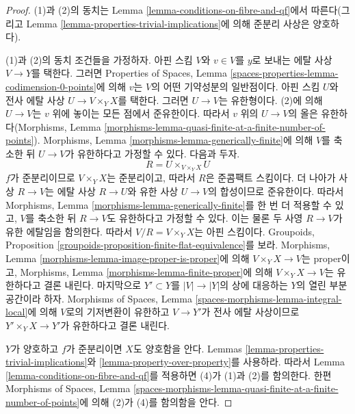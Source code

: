 \begin{proof}
(1)과 (2)의 동치는 Lemma \ref{lemma-conditions-on-fibre-and-qf}에서
따른다(그리고 Lemma \ref{lemma-properties-trivial-implications}에
의해 준분리 사상은 양호하다).

\medskip\noindent
(1)과 (2)의 동치 조건들을 가정하자. 아핀 스킴 $V$와
$v \in V$를 $y$로 보내는 에탈 사상 $V \to Y$를 택한다.
그러면 Properties of Spaces, Lemma
\ref{spaces-properties-lemma-codimension-0-points}에 의해 $v$는
$V$의 어떤 기약성분의 일반점이다.
아핀 스킴 $U$와 전사 에탈 사상 $U \to V \times_Y X$를 택한다.
그러면 $U \to V$는 유한형이다. (2)에 의해 $U \to V$는 $v$ 위에
놓이는 모든 점에서 준유한이다. 따라서 $v$ 위의 $U \to V$의 올은
유한하다(Morphisms, Lemma
\ref{morphisms-lemma-quasi-finite-at-a-finite-number-of-points}).
Morphisms, Lemma \ref{morphisms-lemma-generically-finite}에 의해
$V$를 축소한 뒤 $U \to V$가 유한하다고 가정할 수 있다. 다음과 두자.
$$
R = U \times_{V \times_Y X} U
$$
$f$가 준분리이므로 $V \times_Y X$는 준분리이고, 따라서 $R$은
준콤팩트 스킴이다. 더 나아가
사상 $R \to V$는 에탈 사상 $R \to U$와 유한 사상 $U \to V$의
합성이므로 준유한이다. 따라서 Morphisms, Lemma
\ref{morphisms-lemma-generically-finite}를 한 번 더 적용할 수 있고,
$V$를 축소한 뒤 $R \to V$도 유한하다고 가정할 수 있다.
이는 물론 두 사영 $R \to V$가 유한 에탈임을 함의한다. 따라서
$V/R = V \times_Y X$는 아핀 스킴이다. Groupoids, Proposition
\ref{groupoids-proposition-finite-flat-equivalence}를 보라.
Morphisms, Lemma \ref{morphisms-lemma-image-proper-is-proper}에 의해
$V \times_Y X \to V$는 proper이고, Morphisms, Lemma
\ref{morphisms-lemma-finite-proper}에 의해
$V \times_Y X \to V$는 유한하다고 결론 내린다.
마지막으로 $Y' \subset Y$를 $|V| \to |Y|$의 상에 대응하는 $Y$의
열린 부분공간이라 하자. Morphisms of Spaces, Lemma
\ref{spaces-morphisms-lemma-integral-local}에 의해
$V$로의 기저변환이 유한하고 $V \to Y'$가 전사 에탈 사상이므로
$Y' \times_Y X \to Y'$가 유한하다고 결론 내린다.

\medskip\noindent
$Y$가 양호하고 $f$가 준분리이면 $X$도 양호함을 안다. Lemmas
\ref{lemma-properties-trivial-implications}와
\ref{lemma-property-over-property}를 사용하라.
따라서 Lemma \ref{lemma-conditions-on-fibre-and-qf}를 적용하면 (4)가
(1)과 (2)를 함의한다. 한편 Morphisms of Spaces, Lemma
\ref{spaces-morphisms-lemma-quasi-finite-at-a-finite-number-of-points}에
의해 (2)가 (4)를 함의함을 안다.
\end{proof}

